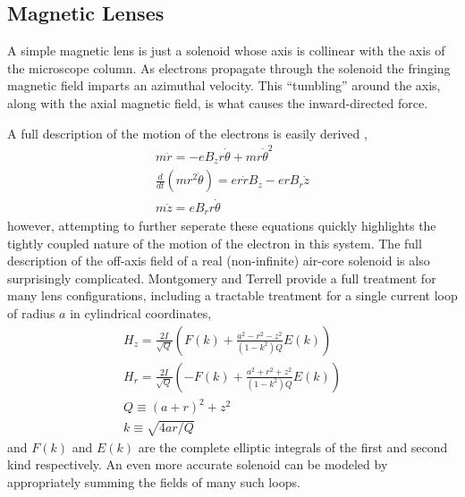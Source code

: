 \subsection{Magnetic Lenses}

A simple magnetic lens is just a solenoid whose axis is collinear with the axis of the microscope column.
As electrons propagate through the solenoid the fringing magnetic field imparts an azimuthal velocity.
This ``tumbling'' around the axis, along with the axial magnetic field, is what causes the inward-directed force. 

A full description of the motion of the electrons is easily derived \cite{el-kareh_electron_1970},
\begin{subequations} \label{eq:lens_eq_of_motion}
\begin{gather}
  m \ddot{r} = -e B_z r \dot{\theta} + m r \dot{\theta}^2                 \\
  \frac{d}{dt} ( m r^2 \dot{\theta} ) = e r \dot{r} B_z - e r B_r \dot{z} \\
  m \ddot{z} = e B_r r \dot{\theta}
\end{gather}
\end{subequations}
however, attempting to further seperate these equations quickly highlights the tightly coupled nature of the motion of the electron in this system.
The full description of the off-axis field of a real (non-infinite) air-core solenoid is also surprisingly complicated.
Montgomery and Terrell \cite{montgomery_some_1961} provide a full treatment for many lens configurations, including a tractable treatment for a single current loop of radius $a$ in cylindrical coordinates, 
\begin{subequations} \label{eq:field_of_loop}
\begin{gather}
  H_z = \frac{2I}{\sqrt{Q}} \left(   F(k) + \frac{ a^2 - r^2 - z^2 }{ (1-k^2) Q } E(k) \right) \\
  H_r = \frac{2I}{\sqrt{Q}} \left( - F(k) + \frac{ a^2 + r^2 + z^2 }{ (1-k^2) Q } E(k) \right) \\
  Q \equiv (a+r)^2 + z^2 \\
  k \equiv \sqrt{ 4 a r / Q }
\end{gather}
\end{subequations}
and $F(k)$ and $E(k)$ are the complete elliptic integrals of the first and second kind respectively.
An even more accurate solenoid can be modeled by appropriately summing the fields of many such loops.

